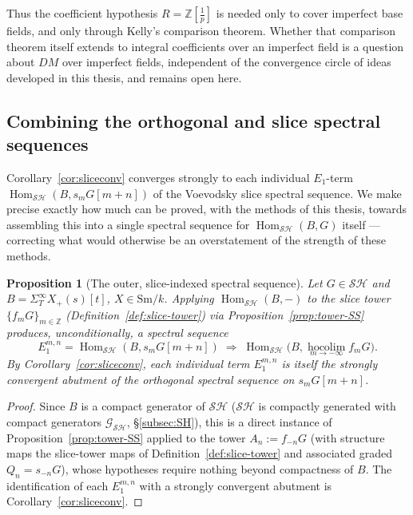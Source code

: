 \documentclass[12pt,a4paper]{article}
\newtheorem{proposition}[theorem]{Proposition}
\theoremstyle{definition}
\newcommand{\Sm}{\mathrm{Sm}}
\newcommand{\SH}{\mathcal{SH}}
\newcommand{\hocolim}{\operatorname*{hocolim}}
\newcommand{\Hom}{\operatorname{Hom}}
\newcommand{\Z}{\mathbb{Z}}
\begin{document}
Thus the coefficient hypothesis $R=\Z[\tfrac1p]$ is needed only to cover
imperfect base fields, and only through Kelly's comparison theorem.  Whether
that comparison theorem itself extends to integral coefficients over an
imperfect field is a question about $DM$ over imperfect fields, independent
of the convergence circle of ideas developed in this thesis, and remains
open here.

\subsection*{Combining the orthogonal and slice spectral sequences}

Corollary~\ref{cor:sliceconv} converges strongly to each individual
$E_1$-term $\Hom_{\SH}(B,s_mG[m+n])$ of the Voevodsky slice spectral
sequence.  We make precise exactly how much can be proved, with the methods
of this thesis, towards assembling this into a single spectral sequence for
$\Hom_{\SH}(B,G)$ itself — correcting what would otherwise be an
overstatement of the strength of these methods.

\begin{proposition}[The outer, slice-indexed spectral sequence]
\label{prop:outer-SS}
Let $G\in\SH$ and $B=\Sigma_T^\infty X_+(s)[t]$, $X\in\Sm/k$.  Applying
$\Hom_{\SH}(B,-)$ to the slice tower $\{f_mG\}_{m\in\Z}$
(Definition~\ref{def:slice-tower}) via Proposition~\ref{prop:tower-SS}
produces, unconditionally, a spectral sequence
\[
  E_1^{m,n} = \Hom_{\SH}(B,s_mG[m+n])
  \;\Rightarrow\;
  \Hom_{\SH}\bigl(B,\hocolim_{m\to-\infty}f_mG\bigr).
\]
By Corollary~\ref{cor:sliceconv}, each individual term $E_1^{m,n}$ is itself
the strongly convergent abutment of the orthogonal spectral sequence on
$s_mG[m+n]$.
\end{proposition}
\begin{proof}
Since $B$ is a compact generator of $\SH$ ($\SH$ is compactly generated with
compact generators $\mathcal{G}_{\SH}$, \S\ref{subsec:SH}), this is a direct
instance of
Proposition~\ref{prop:tower-SS} applied to the tower $A_n:=f_{-n}G$ (with
structure maps the slice-tower maps of Definition~\ref{def:slice-tower} and
associated graded $Q_n=s_{-n}G$), whose hypotheses require nothing beyond
compactness of $B$.  The identification of each $E_1^{m,n}$ with a strongly
convergent abutment is Corollary~\ref{cor:sliceconv}.
\end{proof}
\end{document}
